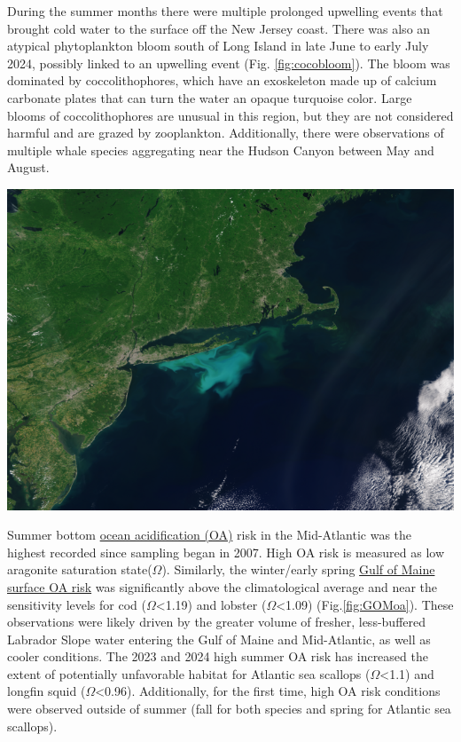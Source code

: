 \documentclass[
  10pt,
]{article}
\let\origfigure\figure
\let\endorigfigure\endfigure
\renewenvironment{figure}[1][2] {
    \expandafter\origfigure\expandafter[H]
} {
    \endorigfigure
}
\begin{document}
During the summer months there were multiple prolonged upwelling events that brought cold water to the surface off the New Jersey coast. There was also an atypical phytoplankton bloom south of Long Island in late June to early July 2024, possibly linked to an upwelling event (Fig. \ref{fig:cocobloom}). The bloom was dominated by coccolithophores, which have an exoskeleton made up of calcium carbonate plates that can turn the water an opaque turquoise color. Large blooms of coccolithophores are unusual in this region, but they are not considered harmful and are grazed by zooplankton. Additionally, there were observations of multiple whale species aggregating near the Hudson Canyon between May and August.

\begin{figure}

{\centering \includegraphics[width=0.55\linewidth]{midatlantic_files/figure-latex/cocobloom-1} 

}

\caption{An OLCI Sentinel 3A true color image with enhanced contrast captured on July 2, 2024. Coccolithophores shed their coccolith plates during the later stages of the bloom cycle, which results in the milky turquoise water color (Image credit: NOAA STAR, OCView and Ocean Color Science Team).}\label{fig:cocobloom}
\end{figure}

Summer bottom \href{https://noaa-edab.github.io/catalog/ocean_acidification.html}{ocean acidification (OA)} risk in the Mid-Atlantic was the highest recorded since sampling began in 2007. High OA risk is measured as low aragonite saturation state(\(\Omega\)). Similarly, the winter/early spring \href{https://noaa-edab.github.io/catalog/gom_acidification.html}{Gulf of Maine surface OA risk} was significantly above the climatological average and near the sensitivity levels for cod (\(\Omega\)\textless1.19) and lobster (\(\Omega\)\textless1.09) (Fig.\ref{fig:GOMoa}). These observations were likely driven by the greater volume of fresher, less-buffered Labrador Slope water entering the Gulf of Maine and Mid-Atlantic, as well as cooler conditions. The 2023 and 2024 high summer OA risk has increased the extent of potentially unfavorable habitat for Atlantic sea scallops (\(\Omega\)\textless1.1) and longfin squid (\(\Omega\)\textless0.96). Additionally, for the first time, high OA risk conditions were observed outside of summer (fall for both species and spring for Atlantic sea scallops).
\end{document}
